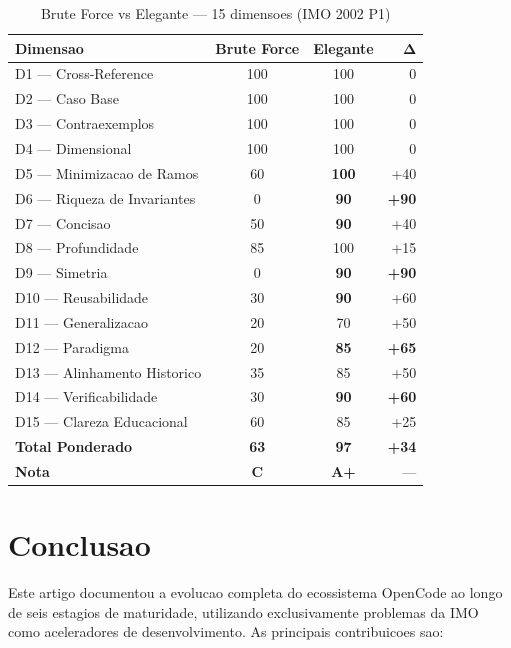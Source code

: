 \documentclass[5p]{elsarticle}
\begin{document}
\begin{table}[H]
  \centering
  \caption{Brute Force vs Elegante — 15 dimensoes (IMO 2002 P1)}
  \label{tab:compare}
  \small
  \begin{tabular}{lccr}
    \toprule
    \textbf{Dimensao} & \textbf{Brute Force} & \textbf{Elegante} & $\mathbf{\Delta}$ \\
    \midrule
    D1 — Cross-Reference & 100 & 100 & 0 \\
    D2 — Caso Base & 100 & 100 & 0 \\
    D3 — Contraexemplos & 100 & 100 & 0 \\
    D4 — Dimensional & 100 & 100 & 0 \\
    D5 — Minimizacao de Ramos & 60 & \textbf{100} & +40 \\
    \rowcolor{greenbg}
    D6 — Riqueza de Invariantes & 0 & \textbf{90} & \textbf{+90} \\
    D7 — Concisao & 50 & \textbf{90} & +40 \\
    D8 — Profundidade & 85 & 100 & +15 \\
    \rowcolor{greenbg}
    D9 — Simetria & 0 & \textbf{90} & \textbf{+90} \\
    D10 — Reusabilidade & 30 & \textbf{90} & +60 \\
    D11 — Generalizacao & 20 & 70 & +50 \\
    \rowcolor{greenbg}
    D12 — Paradigma & 20 & \textbf{85} & \textbf{+65} \\
    D13 — Alinhamento Historico & 35 & 85 & +50 \\
    D14 — Verificabilidade & 30 & \textbf{90} & \textbf{+60} \\
    D15 — Clareza Educacional & 60 & 85 & +25 \\
    \midrule
    \textbf{Total Ponderado} & \textbf{63} & \textbf{97} & \textbf{+34} \\
    \textbf{Nota} & \textbf{C} & \textbf{A+} & --- \\
    \bottomrule
  \end{tabular}
\end{table}

\section{Conclusao}

Este artigo documentou a evolucao completa do ecossistema OpenCode ao longo de
seis estagios de maturidade, utilizando exclusivamente problemas da IMO como
aceleradores de desenvolvimento. As principais contribuicoes sao:
\end{document}

